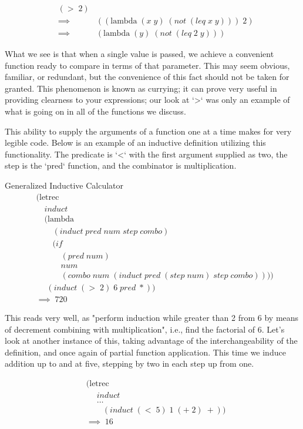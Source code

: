 \begin{align*}
& (> \; 2)
\\& \implies \; &((\text{lambda} \; (x \; y) \; (not \; (leq \; x \; y))) \; 2)
\\& \implies \; &(\text{lambda} \; (y) \; (not \; (leq \; 2 \; y))) \; 
\end{align*}

What we see is that when a single value is passed, we achieve a convenient 
function ready to compare in terms of that parameter. This may seem obvious, 
familiar, or redundant, but the convenience of this fact should not be taken for 
granted. This phenomenon is known as currying; it can prove very useful in 
providing clearness to your expressions; our look at `>` was only an example of 
what is going on in all of the functions we discuss.

This ability to supply the arguments of a function one at a time makes for very 
legible code. Below is an example of an inductive definition utilizing this 
functionality. The predicate is `<` with the first argument supplied as two, the 
step is the `pred` function, and the combinator is multiplication.

Generalized Inductive Calculator
\begin{align*}
& (\text{letrec} \; 
\\& \quad induct \; 
\\& \quad (\text{lambda} \; 
\\& \qquad (induct \; pred \; num \; step \; combo) \; 
\\& \qquad (if \; 
\\& \qquad \quad (pred \; num) \; 
\\& \qquad \quad num \; 
\\& \qquad \quad (combo \; num \; (induct \; pred \; (step \; num) \; step \; combo)))) \; 
\\& \quad \; (induct \; (> \; 2) \; 6 \; pred \; *))
\\& \implies \; 720
\end{align*}

This reads very well, as "perform induction while greater than 2 from 6 by means 
of decrement combining with multiplication", i.e., find the factorial of 6. Let's 
look at another instance of this, taking advantage of the interchangeability of 
the definition, and once again of partial function application. This time we 
induce addition up to and at five, stepping by two in each step up from one.

\begin{align*}
& (\text{letrec} \; 
\\& \quad \; induct \; 
\\& \quad \; \dots
\\& \qquad (induct \; (< \; 5) \; 1 \; (+ \; 2) \; +))
\\& \implies \; 16
\end{align*}

